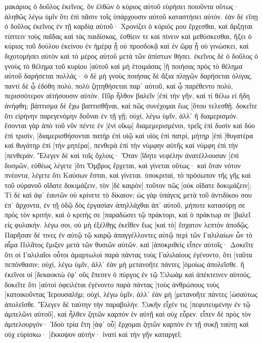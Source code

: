 μακάριος ὁ δοῦλος ἐκεῖνος, ὃν ἐλθὼν ὁ κύριος αὐτοῦ εὑρήσει ποιοῦντα οὕτως· 
ἀληθῶς λέγω ὑμῖν ὅτι ἐπὶ πᾶσιν τοῖς ὑπάρχουσιν αὐτοῦ καταστήσει αὐτόν. 
ἐὰν δὲ εἴπῃ ὁ δοῦλος ἐκεῖνος ἐν τῇ καρδίᾳ αὐτοῦ· Χρονίζει ὁ κύριός μου ἔρχεσθαι, καὶ ἄρξηται τύπτειν τοὺς παῖδας καὶ τὰς παιδίσκας, ἐσθίειν τε καὶ πίνειν καὶ μεθύσκεσθαι, 
ἥξει ὁ κύριος τοῦ δούλου ἐκείνου ἐν ἡμέρᾳ ᾗ οὐ προσδοκᾷ καὶ ἐν ὥρᾳ ᾗ οὐ γινώσκει, καὶ διχοτομήσει αὐτὸν καὶ τὸ μέρος αὐτοῦ μετὰ τῶν ἀπίστων θήσει. 
ἐκεῖνος δὲ ὁ δοῦλος ὁ γνοὺς τὸ θέλημα τοῦ κυρίου [αὐτοῦ καὶ μὴ ἑτοιμάσας [ἢ ποιήσας πρὸς τὸ θέλημα αὐτοῦ δαρήσεται πολλάς· 
ὁ δὲ μὴ γνοὺς ποιήσας δὲ ἄξια πληγῶν δαρήσεται ὀλίγας. παντὶ δὲ ᾧ ἐδόθη πολύ, πολὺ ζητηθήσεται παρ᾽ αὐτοῦ, καὶ ᾧ παρέθεντο πολύ, περισσότερον αἰτήσουσιν αὐτόν. 
Πῦρ ἦλθον βαλεῖν [ἐπὶ τὴν γῆν, καὶ τί θέλω εἰ ἤδη ἀνήφθη; 
βάπτισμα δὲ ἔχω βαπτισθῆναι, καὶ πῶς συνέχομαι ἕως [ὅτου τελεσθῇ. 
δοκεῖτε ὅτι εἰρήνην παρεγενόμην δοῦναι ἐν τῇ γῇ; οὐχί, λέγω ὑμῖν, ἀλλ᾽ ἢ διαμερισμόν. 
ἔσονται γὰρ ἀπὸ τοῦ νῦν πέντε ἐν [ἑνὶ οἴκῳ] διαμεμερισμένοι, τρεῖς ἐπὶ δυσὶν καὶ δύο ἐπὶ τρισίν, 
[διαμερισθήσονται πατὴρ ἐπὶ υἱῷ καὶ υἱὸς ἐπὶ πατρί, μήτηρ [ἐπὶ [θυγατέρα καὶ θυγάτηρ ἐπὶ [τὴν μητέρα], πενθερὰ ἐπὶ τὴν νύμφην αὐτῆς καὶ νύμφη ἐπὶ τὴν [πενθεράν. 
Ἔλεγεν δὲ καὶ τοῖς ὄχλοις· Ὅταν [ἴδητε νεφέλην ἀνατέλλουσαν [ἐπὶ δυσμῶν, εὐθέως λέγετε [ὅτι Ὄμβρος ἔρχεται, καὶ γίνεται οὕτως· 
καὶ ὅταν νότον πνέοντα, λέγετε ὅτι Καύσων ἔσται, καὶ γίνεται. 
ὑποκριταί, τὸ πρόσωπον τῆς γῆς καὶ τοῦ οὐρανοῦ οἴδατε δοκιμάζειν, τὸν [δὲ καιρὸν] τοῦτον πῶς [οὐκ οἴδατε δοκιμάζειν]; 
Τί δὲ καὶ ἀφ᾽ ἑαυτῶν οὐ κρίνετε τὸ δίκαιον; 
ὡς γὰρ ὑπάγεις μετὰ τοῦ ἀντιδίκου σου ἐπ᾽ ἄρχοντα, ἐν τῇ ὁδῷ δὸς ἐργασίαν ἀπηλλάχθαι ἀπ᾽ αὐτοῦ, μήποτε κατασύρῃ σε πρὸς τὸν κριτήν, καὶ ὁ κριτής σε [παραδώσει τῷ πράκτορι, καὶ ὁ πράκτωρ σε [βαλεῖ εἰς φυλακήν. 
λέγω σοι, οὐ μὴ ἐξέλθῃς ἐκεῖθεν ἕως [καὶ τὸ] ἔσχατον λεπτὸν ἀποδῷς. 
Παρῆσαν δέ τινες ἐν αὐτῷ τῷ καιρῷ ἀπαγγέλλοντες αὐτῷ περὶ τῶν Γαλιλαίων ὧν τὸ αἷμα Πιλᾶτος ἔμιξεν μετὰ τῶν θυσιῶν αὐτῶν. 
καὶ [ἀποκριθεὶς εἶπεν αὐτοῖς· Δοκεῖτε ὅτι οἱ Γαλιλαῖοι οὗτοι ἁμαρτωλοὶ παρὰ πάντας τοὺς Γαλιλαίους ἐγένοντο, ὅτι [ταῦτα πεπόνθασιν; 
οὐχί, λέγω ὑμῖν, ἀλλ᾽ ἐὰν μὴ μετανοῆτε πάντες [ὁμοίως ἀπολεῖσθε. 
ἢ ἐκεῖνοι οἱ [δεκαοκτὼ ἐφ᾽ οὓς ἔπεσεν ὁ πύργος ἐν τῷ Σιλωὰμ καὶ ἀπέκτεινεν αὐτούς, δοκεῖτε ὅτι [αὐτοὶ ὀφειλέται ἐγένοντο παρὰ πάντας [τοὺς ἀνθρώπους τοὺς [κατοικοῦντας Ἰερουσαλήμ; 
οὐχί, λέγω ὑμῖν, ἀλλ᾽ ἐὰν μὴ [μετανοῆτε πάντες [ὡσαύτως ἀπολεῖσθε. 
Ἔλεγεν δὲ ταύτην τὴν παραβολήν. Συκῆν εἶχέν τις [πεφυτευμένην ἐν τῷ ἀμπελῶνι αὐτοῦ], καὶ ἦλθεν ζητῶν καρπὸν ἐν αὐτῇ καὶ οὐχ εὗρεν. 
εἶπεν δὲ πρὸς τὸν ἀμπελουργόν· Ἰδοὺ τρία ἔτη [ἀφ᾽ οὗ] ἔρχομαι ζητῶν καρπὸν ἐν τῇ συκῇ ταύτῃ καὶ οὐχ εὑρίσκω· [ἔκκοψον αὐτήν· ἱνατί καὶ τὴν γῆν καταργεῖ; 
